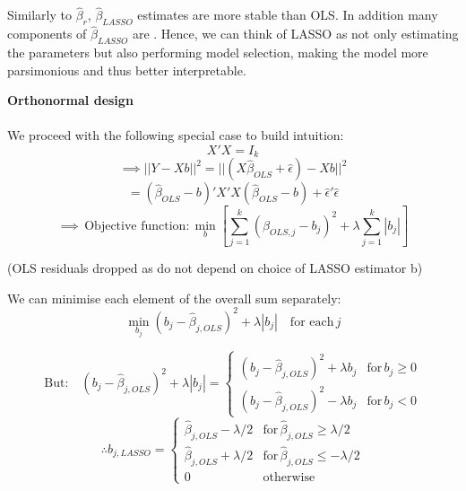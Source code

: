 \documentclass[DIV=14,titlepage=false]{scrreprt}
\begin{document}
Similarly to \(\hat{\beta}_r\), \(\hat{\beta}_{LASSO}\) estimates are more stable than OLS. In addition many components of 
\(\hat{\beta}_{LASSO}\) are \underline{}. Hence, we can think of LASSO as not only estimating the parameters but also performing model selection, making the model more parsimonious and thus better interpretable.

\vspace{5mm}

\begin{example} \textbf{Orthonormal design} \\ \\
We proceed with the following special case to build intuition:
\[X'X=I_k\]
\[\implies ||Y-Xb||^2=||(X\hat{\beta}_{OLS}+\hat{\epsilon})-Xb||^2\]
\[=(\hat{\beta}_{OLS}-b)'X'X(\hat{\beta}_{OLS}-b)+\hat{\epsilon}'\hat{\epsilon}\]
\[\implies \, \text{Objective function:} \, \operatorname*{min}_b\left[\sum_{j=1}^{k}(\hat{\beta}_{OLS,j}-b_j)^2+\lambda\sum_{j=1}^{k}|b_j|\right]\]
\begin{center}
(OLS residuals dropped as do not depend on choice of LASSO estimator b)
\end{center}
We can minimise each element of the overall sum separately:
\[\operatorname*{min}_{b_j}(b_j-\hat{\beta}_{j,OLS})^2+\lambda|b_j| \quad \text{for each} \, j\]

\[\text{But:} \quad (b_j-\hat{\beta}_{j,OLS})^2+\lambda|b_j|=\begin{cases}(b_j-\hat{\beta}_{j,OLS})^2+\lambda b_j & \text{for}\, b_j\geq0 \\ (b_j-\hat{\beta}_{j,OLS})^2-\lambda b_j & \text{for}\, b_j<0\end{cases}\]
\[\therefore \hat{b}_{j,LASSO}=\begin{cases}\hat{\beta}_{j,OLS}-\lambda/2 & \text{for}\, \hat{\beta}_{j,OLS}\geq\lambda/2 \\ \hat{\beta}_{j,OLS}+\lambda/2 & \text{for}\, \hat{\beta}_{j,OLS}\leq-\lambda/2 \\ 0 & \text{otherwise}\end{cases}\]
\end{example}
\end{document}
